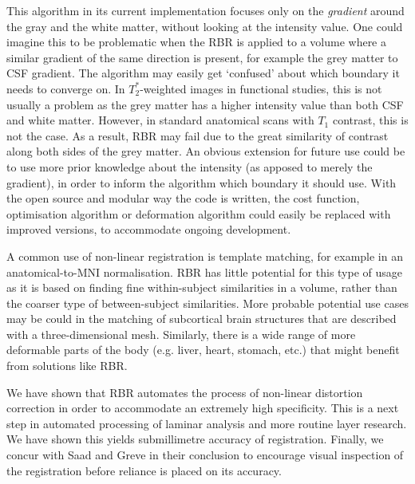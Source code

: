 This algorithm in its current implementation focuses only on the \emph{gradient} around the gray and the white matter, without looking at the intensity value. One could imagine this to be problematic when the RBR is applied to a volume where a similar gradient of the same direction is present, for example the grey matter to CSF gradient. The algorithm may easily get `confused' about which boundary it needs to converge on. In $T_2^*$-weighted images in functional studies, this is not usually a problem as the grey matter has a higher intensity value than both CSF and white matter. However, in standard anatomical scans with $T_1$ contrast, this is not the case. As a result, RBR may fail due to the great similarity of contrast along both sides of the grey matter. An obvious extension for future use could be to use more prior knowledge about the intensity (as apposed to merely the gradient), in order to inform the algorithm which boundary it should use. With the open source and modular way the code is written, the cost function, optimisation algorithm or deformation algorithm could easily be replaced with improved versions, to accommodate ongoing development. 

A common use of non-linear registration is template matching, for example in an anatomical-to-MNI normalisation. RBR has little potential for this type of usage as it is based on finding fine within-subject similarities in a volume, rather than the coarser type of between-subject similarities. More probable potential use cases may be could in the matching of subcortical brain structures that are described with a three-dimensional mesh. Similarly, there is a wide range of more deformable parts of the body (e.g. liver, heart, stomach, etc.) that might benefit from solutions like RBR. 

We have shown that RBR automates the process of non-linear distortion correction in order to accommodate an extremely high specificity. This is a next step in automated processing of laminar analysis and more routine layer research. We have shown this yields submillimetre accuracy of registration. Finally, we concur with Saad \cite{Saad2009} and Greve \cite{Greve2009} in their conclusion to encourage visual inspection of the registration before reliance is placed on its accuracy.







